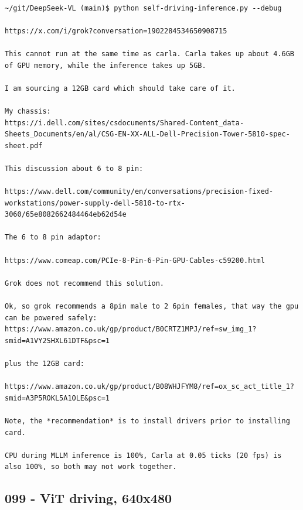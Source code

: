 \begin{verbatim}

~/git/DeepSeek-VL (main)$ python self-driving-inference.py --debug

https://x.com/i/grok?conversation=1902284534650908715

This cannot run at the same time as carla. Carla takes up about 4.6GB of GPU memory, while the inference takes up 5GB.

I am sourcing a 12GB card which should take care of it.

My chassis:
https://i.dell.com/sites/csdocuments/Shared-Content_data-Sheets_Documents/en/al/CSG-EN-XX-ALL-Dell-Precision-Tower-5810-spec-sheet.pdf

This discussion about 6 to 8 pin:

https://www.dell.com/community/en/conversations/precision-fixed-workstations/power-supply-dell-5810-to-rtx-3060/65e8082662484464eb62d54e

The 6 to 8 pin adaptor:

https://www.comeap.com/PCIe-8-Pin-6-Pin-GPU-Cables-c59200.html

Grok does not recommend this solution. 

Ok, so grok recommends a 8pin male to 2 6pin females, that way the gpu can be powered safely:
https://www.amazon.co.uk/gp/product/B0CRTZ1MPJ/ref=sw_img_1?smid=A1VY2SHXL61DTF&psc=1

plus the 12GB card:

https://www.amazon.co.uk/gp/product/B08WHJFYM8/ref=ox_sc_act_title_1?smid=A3P5ROKL5A1OLE&psc=1

Note, the *recommendation* is to install drivers prior to installing card.

CPU during MLLM inference is 100%, Carla at 0.05 ticks (20 fps) is also 100%, so both may not work together.

\end{verbatim}

\subsection{099 - ViT driving, 640x480}
\label{app_res:099}

